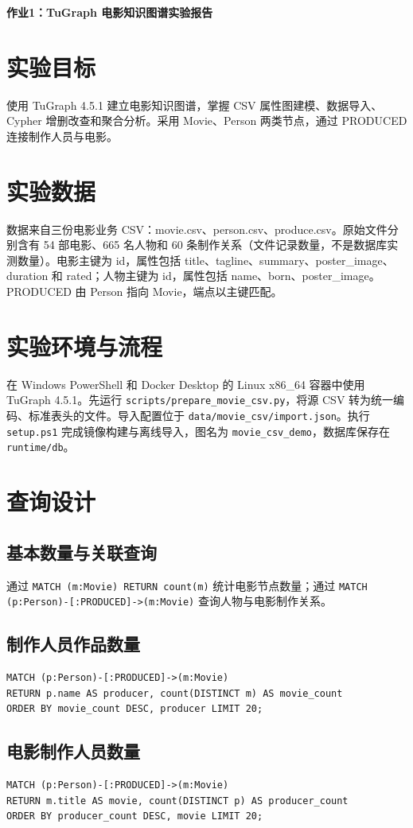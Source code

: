 \documentclass[UTF8,a4paper,zihao=-4,fontset=windows]{ctexart}
\begin{document}

\begin{center}
{\Large\bfseries 作业1：TuGraph 电影知识图谱实验报告}
\end{center}
\section{实验目标}
使用 TuGraph 4.5.1 建立电影知识图谱，掌握 CSV 属性图建模、数据导入、Cypher 增删改查和聚合分析。采用 Movie、Person 两类节点，通过 PRODUCED 连接制作人员与电影。
\section{实验数据}
数据来自三份电影业务 CSV：movie.csv、person.csv、produce.csv。原始文件分别含有 54 部电影、665 名人物和 60 条制作关系（文件记录数量，不是数据库实测数量）。电影主键为 id，属性包括 title、tagline、summary、poster\_image、duration 和 rated；人物主键为 id，属性包括 name、born、poster\_image。PRODUCED 由 Person 指向 Movie，端点以主键匹配。
\section{实验环境与流程}
在 Windows PowerShell 和 Docker Desktop 的 Linux x86\_64 容器中使用 TuGraph 4.5.1。先运行 \texttt{scripts/prepare\_movie\_csv.py}，将源 CSV 转为统一编码、标准表头的文件。导入配置位于 \texttt{data/movie\_csv/import.json}。执行 \texttt{setup.ps1} 完成镜像构建与离线导入，图名为 \texttt{movie\_csv\_demo}，数据库保存在 \texttt{runtime/db}。
\section{查询设计}
\subsection{基本数量与关联查询}
通过 \texttt{MATCH (m:Movie) RETURN count(m)} 统计电影节点数量；通过 \texttt{MATCH (p:Person)-[:PRODUCED]->(m:Movie)} 查询人物与电影制作关系。
\subsection{制作人员作品数量}
\begin{lstlisting}[basicstyle=\ttfamily\small,breaklines=true]
MATCH (p:Person)-[:PRODUCED]->(m:Movie)
RETURN p.name AS producer, count(DISTINCT m) AS movie_count
ORDER BY movie_count DESC, producer LIMIT 20;
\end{lstlisting}
\subsection{电影制作人员数量}
\begin{lstlisting}[basicstyle=\ttfamily\small,breaklines=true]
MATCH (p:Person)-[:PRODUCED]->(m:Movie)
RETURN m.title AS movie, count(DISTINCT p) AS producer_count
ORDER BY producer_count DESC, movie LIMIT 20;
\end{lstlisting}
\end{document}
